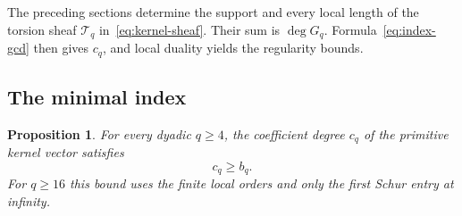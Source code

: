 \documentclass[11pt,a4paper,reqno]{amsart}
\numberwithin{equation}{section}
\theoremstyle{plain}
\newtheorem{proposition}[theorem]{Proposition}
\theoremstyle{definition}
\theoremstyle{remark}
\begin{document}
The preceding sections determine the support and every local length
of the torsion sheaf $\mathcal T_q$ in~\eqref{eq:kernel-sheaf}.
Their sum is $\deg G_q$. Formula~\eqref{eq:index-gcd} then gives $c_q$,
and local duality yields the regularity bounds.

\subsection{The minimal index}

\begin{proposition}\label{prop:index-lower}
For every dyadic $q\geq4$, the coefficient degree $c_q$ of the
primitive kernel vector satisfies
\[
 c_q\geq b_q.
\]
For $q\geq16$ this bound uses the finite local orders and only the
first Schur entry at infinity.
\end{proposition}
\end{document}

